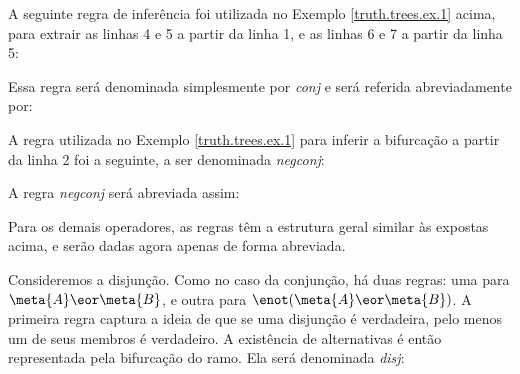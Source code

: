 A seguinte regra de inferência foi utilizada no Exemplo \ref{truth.trees.ex.1} acima, para extrair as linhas 4 e 5 a partir da linha 1, e as linhas 6 e 7 a partir da linha 5:


Essa regra será denominada simplesmente por \emph{conj} e será referida abreviadamente por:



A regra utilizada no Exemplo \ref{truth.trees.ex.1}  para inferir a bifurcação a partir da linha 2 foi a seguinte, a ser denominada \emph{negconj}:


A regra \emph{negconj} será abreviada assim:

Para os demais operadores, as regras têm a estrutura geral similar às expostas acima, e serão dadas agora apenas de forma abreviada. 

Consideremos a disjunção. 
Como no caso da conjunção, há duas regras: uma para $\meta{A} \eor \meta{B}$, e outra para $\enot(\meta{A} \eor \meta{B})$. 
A primeira regra captura a ideia de que se uma disjunção é verdadeira, pelo menos um de seus membros é verdadeiro.
A existência de alternativas é então representada pela bifurcação do ramo. 
Ela será denominada \emph{disj}:

